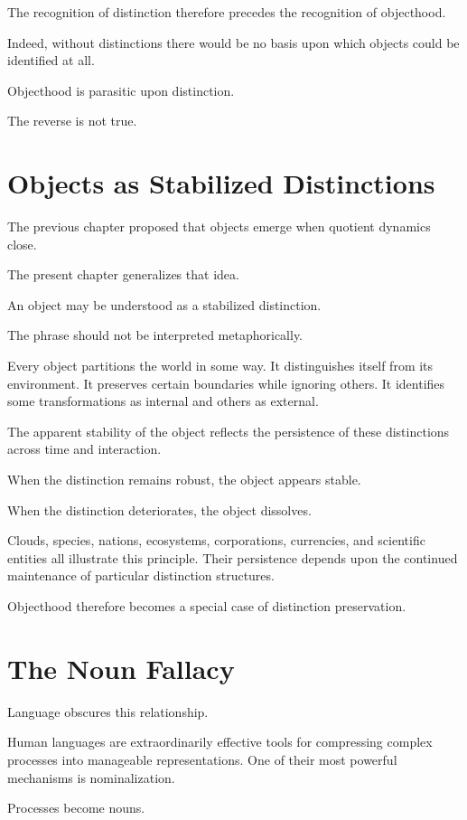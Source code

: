 \documentclass[11pt,oneside,openany]{book}
\begin{document}
The recognition of distinction therefore precedes the recognition of objecthood.

Indeed, without distinctions there would be no basis upon which objects could be identified at all.

Objecthood is parasitic upon distinction.

The reverse is not true.

\section{Objects as Stabilized Distinctions}

The previous chapter proposed that objects emerge when quotient dynamics close.

The present chapter generalizes that idea.

An object may be understood as a stabilized distinction.

The phrase should not be interpreted metaphorically.

Every object partitions the world in some way. It distinguishes itself from its environment. It preserves certain boundaries while ignoring others. It identifies some transformations as internal and others as external.

The apparent stability of the object reflects the persistence of these distinctions across time and interaction.

When the distinction remains robust, the object appears stable.

When the distinction deteriorates, the object dissolves.

Clouds, species, nations, ecosystems, corporations, currencies, and scientific entities all illustrate this principle. Their persistence depends upon the continued maintenance of particular distinction structures.

Objecthood therefore becomes a special case of distinction preservation.

\section{The Noun Fallacy}

Language obscures this relationship.

Human languages are extraordinarily effective tools for compressing complex processes into manageable representations. One of their most powerful mechanisms is nominalization.

Processes become nouns.
\end{document}
